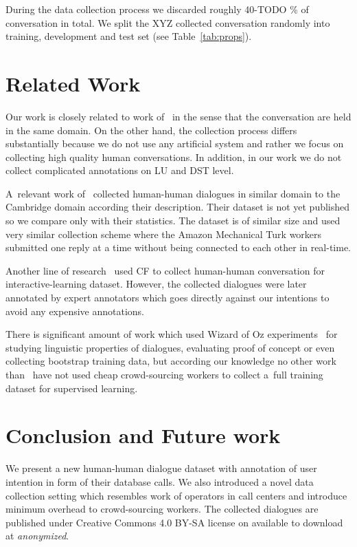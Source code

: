 \documentclass[runningheads,a4paper]{llncs}
\begin{document}
During the data collection process we discarded roughly 40-TODO \% of conversation in total.
We split the XYZ collected conversation randomly into training, development and test set (see Table~\ref{tab:props}).


\section{Related Work}
\label{sec:related}

Our work is closely related  to work of~\cite{williams2013dstc1,henderson2014dstc2,henderson2014dstc3} in the sense that the conversation are held in the same domain.
On the other hand, the collection process differs substantially because we do not use any artificial system and rather we focus on collecting high quality human conversations. In addition, in our work we do not collect complicated annotations on LU and DST level.

A~relevant work of~\cite{wen2016network} collected human-human dialogues in similar domain to the Cambridge domain according their description.
Their dataset is not yet published so we compare only with their statistics.
The dataset is of similar size and used very similar collection scheme where the Amazon Mechanical Turk workers submitted one reply at a time without being connected to each other in real-time.

Another line of research~\cite{vodolan2016data} used CF to collect human-human conversation for interactive-learning dataset.
However, the collected dialogues were later annotated by expert annotators which goes directly against our intentions to avoid any expensive annotations.

There is significant amount of work which used Wizard of Oz experiments~\cite{whittaker2002fish,walker1997evaluating,rieser2008learning} for studying linguistic properties of dialogues, evaluating proof of concept or even collecting bootstrap training data, but according our knowledge no other work than~\cite{wen2016network} have not used cheap crowd-sourcing workers to collect a~full training dataset for supervised learning.

\section{Conclusion and Future work}
\label{sec:conc}
We present a new human-human dialogue dataset with annotation of user intention in form of their database calls.
We also introduced a novel data collection setting which resembles work of operators in call centers and introduce minimum overhead to crowd-sourcing workers.
The collected dialogues are published under Creative Commons 4.0 BY-SA license on available to download at {\it anonymized}.  %
\end{document}
